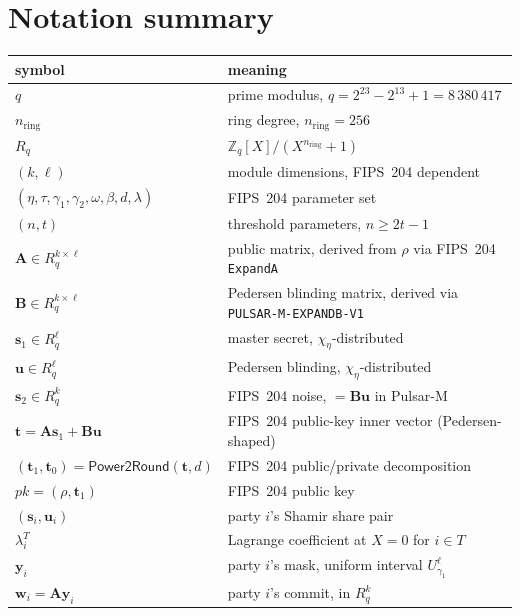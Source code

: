 \documentclass[11pt,a4paper]{article}
\theoremstyle{definition}
\theoremstyle{remark}
\newcommand{\Rq}{R_q}
\newcommand{\Zq}{\mathbb{Z}_q}
\newcommand{\Power}{\mathsf{Power2Round}}
\begin{document}
\appendix
\section{Notation summary}
\label{sec:notation-table}

\begin{center}
\begin{tabular}{l l}
\toprule
symbol & meaning \\
\midrule
$q$ & prime modulus, $q = 2^{23} - 2^{13} + 1 = 8\,380\,417$ \\
$n_{\mathrm{ring}}$ & ring degree, $n_{\mathrm{ring}} = 256$ \\
$\Rq$ & $\Zq[X]/(X^{n_{\mathrm{ring}}} + 1)$ \\
$(k, \ell)$ & module dimensions, FIPS~204 dependent \\
$(\eta, \tau, \gamma_1, \gamma_2, \omega, \beta, d, \lambda)$ & FIPS~204 parameter set \\
$(n, t)$ & threshold parameters, $n \ge 2t-1$ \\
$\mathbf{A} \in \Rq^{k \times \ell}$ & public matrix, derived from $\rho$ via FIPS~204 \texttt{ExpandA} \\
$\mathbf{B} \in \Rq^{k \times \ell}$ & Pedersen blinding matrix, derived via \texttt{PULSAR-M-EXPANDB-V1} \\
$\mathbf{s}_1 \in \Rq^\ell$ & master secret, $\chi_\eta$-distributed \\
$\mathbf{u} \in \Rq^\ell$ & Pedersen blinding, $\chi_\eta$-distributed \\
$\mathbf{s}_2 \in \Rq^k$ & FIPS~204 noise, $= \mathbf{B}\mathbf{u}$ in Pulsar-M \\
$\mathbf{t} = \mathbf{A}\mathbf{s}_1 + \mathbf{B}\mathbf{u}$ & FIPS~204 public-key inner vector (Pedersen-shaped) \\
$(\mathbf{t}_1, \mathbf{t}_0) = \Power(\mathbf{t}, d)$ & FIPS~204 public/private decomposition \\
$\mathit{pk} = (\rho, \mathbf{t}_1)$ & FIPS~204 public key \\
$(\mathbf{s}_i, \mathbf{u}_i)$ & party $i$'s Shamir share pair \\
$\lambda_i^T$ & Lagrange coefficient at $X = 0$ for $i \in T$ \\
$\mathbf{y}_i$ & party $i$'s mask, uniform interval $U_{\gamma_1}^\ell$ \\
$\mathbf{w}_i = \mathbf{A}\mathbf{y}_i$ & party $i$'s commit, in $\Rq^k$ \\

\end{tabular}
\end{center}
\end{document}
